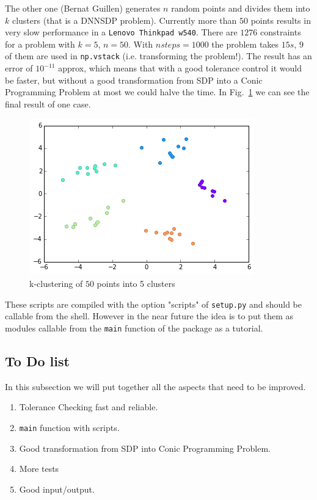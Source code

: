 \documentclass[paper=a4, fontsize=11pt]{scrartcl}
\numberwithin{equation}{section}		%
\numberwithin{figure}{section}			%
\numberwithin{table}{section}				%
\begin{document}
The other one (Bernat Guillen) generates $n$ random points and divides them into $k$ clusters (that is a DNNSDP problem). Currently more than $50$ points results in very slow performance in a \texttt{Lenovo Thinkpad w540}. There are $1276$ constraints for a problem with $k=5$, $n=50$. With $nsteps = 1000$ the problem takes $15 s$, $9$ of them are used in \texttt{np.vstack} (i.e. transforming the problem!). The result has an error of $10^{-11}$ approx, which means that with a good tolerance control it would be faster, but without a good transformation from SDP into a Conic Programming Problem at most we could halve the time. In Fig.~\ref{fig:kclust} we can see the final result of one case.
\begin{figure}[ht]
\label{fig:kclust}
\centering
\includegraphics[scale=0.7]{images/kclustering.png} 
\caption{k-clustering of $50$ points into 5 clusters}

\end{figure}

These scripts are compiled with the option "scripts" of \texttt{setup.py} and should be callable from the shell. However in the near future the idea is to put them as modules callable from the \texttt{main} function of the package as a tutorial. 

\subsection{To Do list}
In this subsection we will put together all the aspects that need to be improved.
\begin{enumerate}
\item Tolerance Checking fast and reliable.
\item \texttt{main} function with scripts.
\item Good transformation from SDP into Conic Programming Problem.
\item More tests
\item Good input/output.
\end{enumerate}
\end{document}
